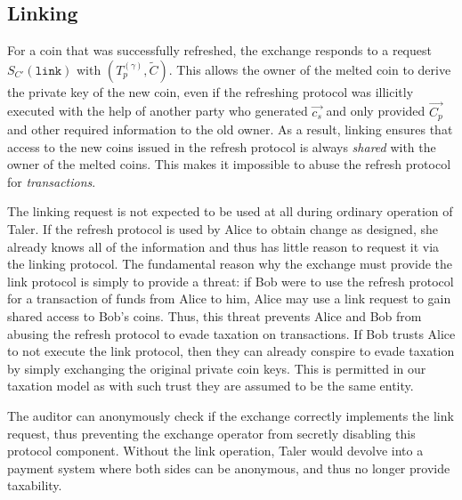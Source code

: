 \documentclass[sigconf, authordraft]{acmart}
\begin{document}

%

\subsection{Linking}\label{subsec:linking}


For a coin that was successfully refreshed, the exchange responds to a
request $S_{C'}(\mathtt{link})$ with $(T^{(\gamma)}_p, \widetilde{C})$.
%
This allows the owner of the melted coin to derive the private key of
the new coin, even if the refreshing protocol was illicitly executed
with the help of another party who generated $\vec{c_s}$ and only
provided $\vec{C_p}$ and other required information to the old owner.
As a result, linking ensures that access to the new coins issued in
the refresh protocol is always {\em shared} with the owner of the
melted coins.  This makes it impossible to abuse the refresh protocol
for {\em transactions}.

The linking request is not expected to be used at all during ordinary
operation of Taler.  If the refresh protocol is used by Alice to
obtain change as designed, she already knows all of the information
and thus has little reason to request it via the linking protocol.
The fundamental reason why the exchange must provide the link protocol
is simply to provide a threat: if Bob were to use the refresh protocol
for a transaction of funds from Alice to him, Alice may use a link
request to gain shared access to Bob's coins. Thus, this threat
prevents Alice and Bob from abusing the refresh protocol to evade
taxation on transactions. If Bob trusts Alice to not execute the link
protocol, then they can already conspire to evade taxation by simply
exchanging the original private coin keys.  This is permitted in our
taxation model as with such trust they are assumed to be the same
entity.

The auditor can anonymously check if the exchange correctly implements the
link request, thus preventing the exchange operator from secretly disabling
this protocol component.  Without the link operation, Taler would
devolve into a payment system where both sides can be anonymous, and
thus no longer provide taxability.
\end{document}
